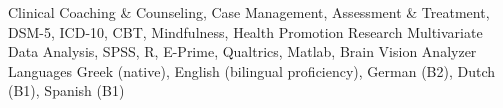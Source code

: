 

\begin{cvskills}
	\cvskill
		{Clinical} %
		{
			Coaching \& Counseling,
			Case Management, Assessment \& Treatment, DSM-5, ICD-10, CBT, Mindfulness, Health Promotion
		} %
	\cvskill
		{Research} %
		{
			Multivariate Data Analysis, SPSS, R, E-Prime, Qualtrics, Matlab, Brain Vision Analyzer
		} %
	\cvskill
		{Languages} %
		{Greek (native), English (bilingual proficiency), German (B2), Dutch (B1), Spanish (B1)} %
\end{cvskills}
